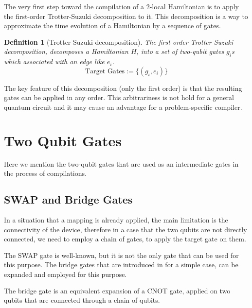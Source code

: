 \documentclass{article}
\newtheorem{defn}{Definition}
\begin{document}
  The very first step toward the compilation of a 2-local Hamiltonian is to apply the first-order Trotter-Suzuki decomposition \cite{?} to it. This decomposition is a way to approximate the time evolution of a Hamiltonian by a sequence of gates. 

  \begin{defn}[Trotter-Suzuki decomposition]
    The first order Trotter-Suzuki decomposition, decomposes a Hamiltonian $H$, into a set of two-qubit gates $g_i$s which associated with an edge like $e_i$.
    \begin{equation}
      \text{Target Gates} := \{ (g_i, e_i) \}
    \end{equation}
  \end{defn}

  The key feature of this decomposition (only the first order) is that the resulting gates can be applied in any order. This arbitrariness is not hold for a general quantum circuit and it may cause an advantage for a problem-specific compiler. %
  

  \section{Two Qubit Gates}
  Here we mention the two-qubit gates that are used as an intermediate gates in the process of compilations.
  
  \subsection{SWAP and Bridge Gates}
  In a situation that a mapping is already applied, the main limitation is the connectivity of the device, therefore in a case that the two qubits are not directly connected, we need to employ a chain of gates, to apply the target gate on them.

  The SWAP gate is well-known, but it is not the only gate that can be used for this purpose. The bridge gates that are introduced in \cite{?} for a simple case, can be expanded and employed for this purpose. 

  The bridge gate is an equivalent expansion of a CNOT gate, applied on two qubits that are connected through a chain of qubits.
  
\end{document}
